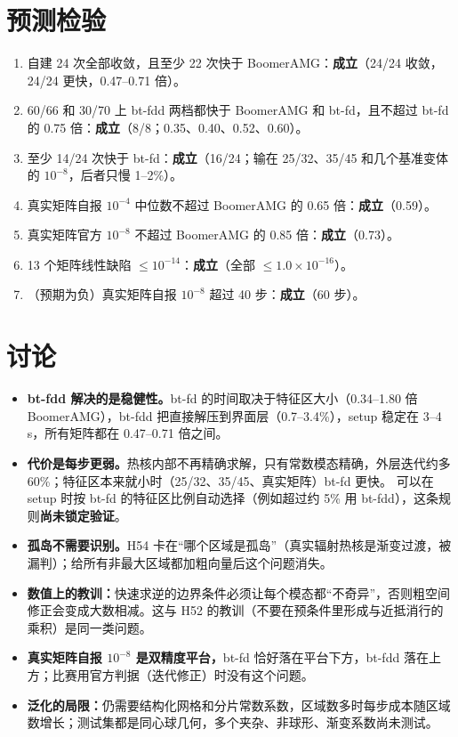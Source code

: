 \documentclass[11pt,a4paper]{ctexart}
\begin{document}
\section{预测检验}
\begin{enumerate}
\item 自建 24 次全部收敛，且至少 22 次快于 BoomerAMG：\textbf{成立}（24/24 收敛，24/24 更快，0.47--0.71 倍）。
\item 60/66 和 30/70 上 bt-fdd 两档都快于 BoomerAMG 和 bt-fd，且不超过 bt-fd 的 0.75 倍：\textbf{成立}（8/8；0.35、0.40、0.52、0.60）。
\item 至少 14/24 次快于 bt-fd：\textbf{成立}（16/24；输在 25/32、35/45 和几个基准变体的 $10^{-8}$，后者只慢 1--2\%）。
\item 真实矩阵自报 $10^{-4}$ 中位数不超过 BoomerAMG 的 0.65 倍：\textbf{成立}（0.59）。
\item 真实矩阵官方 $10^{-8}$ 不超过 BoomerAMG 的 0.85 倍：\textbf{成立}（0.73）。
\item 13 个矩阵线性缺陷 $\le10^{-14}$：\textbf{成立}（全部 $\le1.0\times10^{-16}$）。
\item （预期为负）真实矩阵自报 $10^{-8}$ 超过 40 步：\textbf{成立}（60 步）。
\end{enumerate}

\section{讨论}
\begin{itemize}
\item \textbf{bt-fdd 解决的是稳健性。}bt-fd 的时间取决于特征区大小（0.34--1.80 倍 BoomerAMG），bt-fdd 把直接解压到界面层（0.7--3.4\%），setup 稳定在 3--4\,s，所有矩阵都在 0.47--0.71 倍之间。
\item \textbf{代价是每步更弱。}热核内部不再精确求解，只有常数模态精确，外层迭代约多 60\%；特征区本来就小时（25/32、35/45、真实矩阵）bt-fd 更快。
可以在 setup 时按 bt-fd 的特征区比例自动选择（例如超过约 5\% 用 bt-fdd），这条规则\textbf{尚未锁定验证}。
\item \textbf{孤岛不需要识别。}H54 卡在“哪个区域是孤岛”（真实辐射热核是渐变过渡，被漏判）；给所有非最大区域都加粗向量后这个问题消失。
\item \textbf{数值上的教训：}快速求逆的边界条件必须让每个模态都“不奇异”，否则粗空间修正会变成大数相减。这与 H52 的教训（不要在预条件里形成与近抵消行的乘积）是同一类问题。
\item \textbf{真实矩阵自报 $10^{-8}$ 是双精度平台，}bt-fd 恰好落在平台下方，bt-fdd 落在上方；比赛用官方判据（迭代修正）时没有这个问题。
\item \textbf{泛化的局限：}仍需要结构化网格和分片常数系数，区域数多时每步成本随区域数增长；测试集都是同心球几何，多个夹杂、非球形、渐变系数尚未测试。
\end{itemize}
\end{document}
